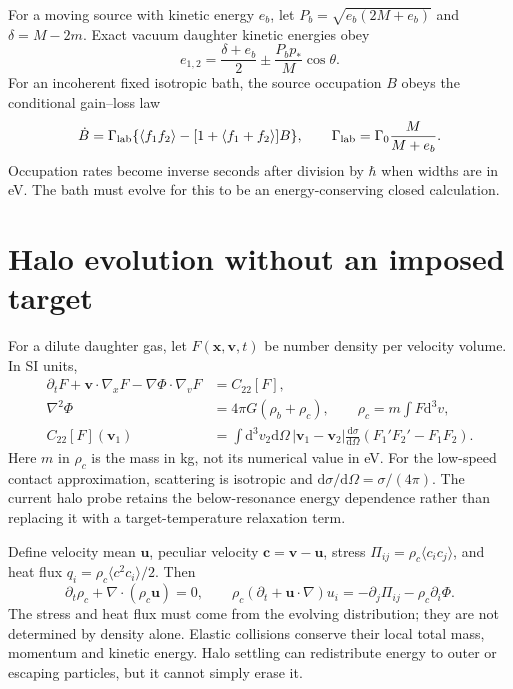 \documentclass[11pt]{article}
\newcommand{\dd}{\mathrm{d}}
\begin{document}
For a moving source with kinetic energy $e_b$, let $P_b=\sqrt{e_b(2M+e_b)}$ and $\delta=M-2m$. Exact vacuum daughter kinetic energies obey
\begin{equation}
 e_{1,2}=\frac{\delta+e_b}{2}\pm\frac{P_b p_*}{M}\cos\theta.
\end{equation}
For an incoherent fixed isotropic bath, the source occupation $B$ obeys the conditional gain--loss law
\begin{equation}
 \dot B=\Gamma_{\rm lab}\{\langle f_1f_2\rangle-[1+\langle f_1+f_2\rangle]B\},\qquad
 \Gamma_{\rm lab}=\Gamma_0\frac{M}{M+e_b}.
\end{equation}
Occupation rates become inverse seconds after division by $\hbar$ when widths are in eV. The bath must evolve for this to be an energy-conserving closed calculation.

\section{Halo evolution without an imposed target}
For a dilute daughter gas, let $F(\mathbf x,\mathbf v,t)$ be number density per velocity volume. In SI units,
\begin{align}
 \partial_t F+\mathbf v\cdot\nabla_xF-\nabla\Phi\cdot\nabla_vF&=C_{22}[F],\\
 \nabla^2\Phi&=4\pi G(\rho_b+\rho_c),\qquad
 \rho_c=m\int F\dd^3v,\\
 C_{22}[F](\mathbf v_1)&=\int\dd^3v_2\dd\Omega\,|\mathbf v_1-\mathbf v_2|
 \frac{\dd\sigma}{\dd\Omega}(F_1'F_2'-F_1F_2).
\end{align}
Here $m$ in $\rho_c$ is the mass in kg, not its numerical value in eV. For the low-speed contact approximation, scattering is isotropic and $\dd\sigma/\dd\Omega=\sigma/(4\pi)$. The current halo probe retains the below-resonance energy dependence rather than replacing it with a target-temperature relaxation term.

Define velocity mean $\mathbf u$, peculiar velocity $\mathbf c=\mathbf v-\mathbf u$, stress $\Pi_{ij}=\rho_c\langle c_ic_j\rangle$, and heat flux $q_i=\rho_c\langle c^2c_i\rangle/2$. Then
\begin{equation}
 \partial_t\rho_c+\nabla\cdot(\rho_c\mathbf u)=0,\qquad
 \rho_c(\partial_t+\mathbf u\cdot\nabla)u_i=-\partial_j\Pi_{ij}-\rho_c\partial_i\Phi.
\end{equation}
The stress and heat flux must come from the evolving distribution; they are not determined by density alone. Elastic collisions conserve their local total mass, momentum and kinetic energy. Halo settling can redistribute energy to outer or escaping particles, but it cannot simply erase it.
\end{document}
